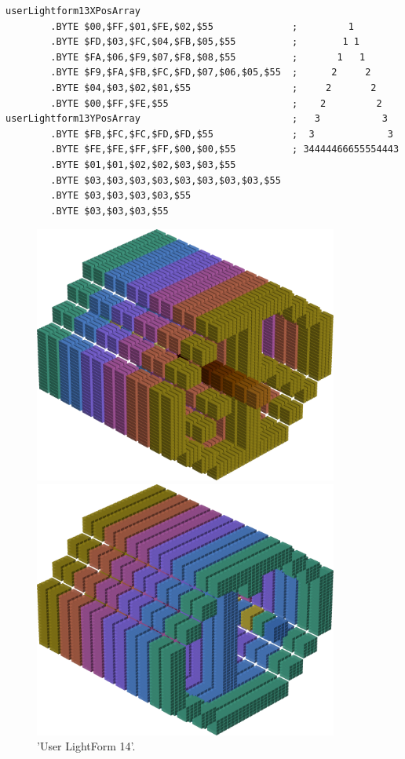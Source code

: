 \begin{lstlisting}
userLightform13XPosArray
        .BYTE $00,$FF,$01,$FE,$02,$55              ;         1        
        .BYTE $FD,$03,$FC,$04,$FB,$05,$55          ;        1 1       
        .BYTE $FA,$06,$F9,$07,$F8,$08,$55          ;       1   1      
        .BYTE $F9,$FA,$FB,$FC,$FD,$07,$06,$05,$55  ;      2     2     
        .BYTE $04,$03,$02,$01,$55                  ;     2       2    
        .BYTE $00,$FF,$FE,$55                      ;    2         2   
userLightform13YPosArray                           ;   3           3  
        .BYTE $FB,$FC,$FC,$FD,$FD,$55              ;  3             3 
        .BYTE $FE,$FE,$FF,$FF,$00,$00,$55          ; 34444466655554443
        .BYTE $01,$01,$02,$02,$03,$03,$55
        .BYTE $03,$03,$03,$03,$03,$03,$03,$03,$55
        .BYTE $03,$03,$03,$03,$55
        .BYTE $03,$03,$03,$55
\end{lstlisting}


\begin{figure}[H]
    \centering
    \begin{adjustbox}{width=10cm,center}
      \includegraphics[width=10cm]{src/colorspace_patterns/pattern22-45.png}%
    \end{adjustbox}
    \begin{adjustbox}{width=10cm}
      \includegraphics[width=10cm]{src/colorspace_patterns/pattern22-225.png}%
    \end{adjustbox}
\caption{'User LightForm 14'.}
\end{figure}
\clearpage

